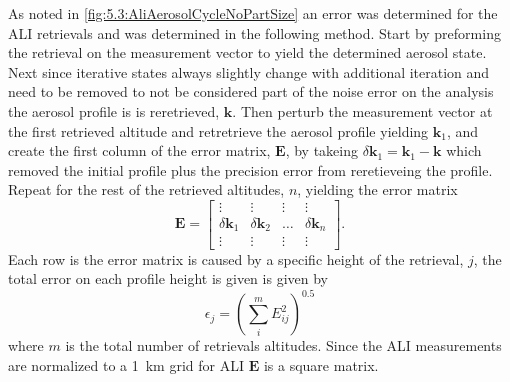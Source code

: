 As noted in \autoref{fig:5.3:AliAerosolCycleNoPartSize} an error was determined for the ALI retrievals and was determined in the following method. Start by preforming the retrieval on the measurement vector to yield the determined aerosol state. Next since iterative states always slightly change with additional iteration and need to be removed to not be considered part of the noise error on the analysis the aerosol profile is is reretrieved, $\mathbf{k}$. Then perturb the measurement vector at the first retrieved altitude and retretrieve the aerosol profile yielding $\mathbf{k}_{1}$, and create the first column of the error matrix, $\mathbf{E}$, by takeing $\delta\mathbf{k}_{1} = \mathbf{k}_{1}-\mathbf{k}$ which removed the initial profile plus the precision error from reretieveing the profile. Repeat for the rest of the retrieved altitudes, $n$, yielding the error matrix
\begin{equation}
    \mathbf{E} =
    \left[ \begin{array}{ccccc}
    \vdots & \vdots & \vdots & \vdots \\
    \delta\mathbf{k}_{1} & \delta\mathbf{k}_{2} & \dots & \delta\mathbf{k}_{n} \\
    \vdots & \vdots & \vdots & \vdots
    \end{array} \right].
\end{equation}
Each row is the error matrix is caused by a specific height of the retrieval, $j$, the total error on each profile height is given is given by
\begin{equation}
    \epsilon_{j} = \left( \sum^{m}_{i} E_{ij}^{2} \right)^{0.5}
\end{equation}
where $m$ is the total number of retrievals altitudes. Since the ALI measurements are normalized to a 1~km grid for ALI $\mathbf{E}$ is a square matrix.


